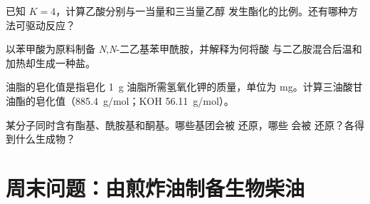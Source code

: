 \begin{exercise}[$\star\star$]\label{exo:b2:acyl-substitution:9}
已知 $K = 4$，计算乙酸分别与一当量和三当量乙醇
发生酯化的比例。还有哪种方法可驱动反应？
\end{exercise}

\begin{exercise}[$\star\star\star$]\label{exo:b2:acyl-substitution:10}
以苯甲酸为原料制备 \textit{N},\textit{N}-二乙基苯甲酰胺，并解释为何将酸
与二乙胺混合后温和加热却生成一种盐。
\end{exercise}

\begin{exercise}[$\star\star\star$]\label{exo:b2:acyl-substitution:11}
油脂的皂化值是指皂化
\qty{1}{g} 油脂所需氢氧化钾的质量，单位为 mg。计算三油酸甘油酯的皂化值（\qty{885.4}{g/mol}；KOH \qty{56.11}{g/mol}）。
\end{exercise}

\begin{exercise}[$\star\star\star$]\label{exo:b2:acyl-substitution:12}
某分子同时含有酯基、酰胺基和酮基。哪些基团会被  还原，哪些
会被  还原？各得到什么生成物？
\end{exercise}

\section{周末问题：由煎炸油制备生物柴油}

